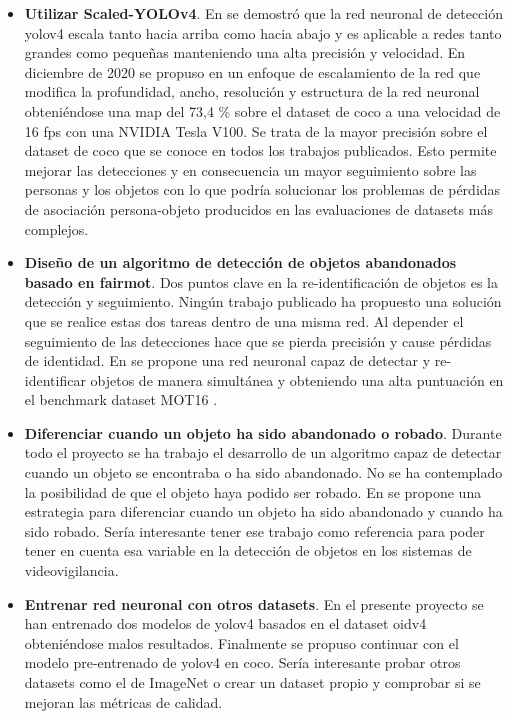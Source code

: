 \begin{itemize}
    \item \textbf{Utilizar Scaled-YOLOv4}. En \cite{bochkovskiy2020yolov4} se demostró que la red neuronal de detección \gls{yolov4} escala tanto hacia arriba como hacia abajo y es aplicable a redes tanto grandes como pequeñas manteniendo una alta precisión y velocidad. En diciembre de 2020 se propuso en \cite{wang2021scaledyolov4} un enfoque de escalamiento de la red que modifica la profundidad, ancho, resolución y estructura de la red neuronal obteniéndose una \gls{map} del 73,4 \% sobre el dataset de \gls{coco} a una velocidad de 16 \gls{fps} con una NVIDIA Tesla V100. Se trata de la mayor precisión sobre el dataset de \gls{coco} que se conoce en todos los trabajos publicados. Esto permite mejorar las detecciones y en consecuencia un mayor seguimiento sobre las personas y los objetos con lo que podría solucionar los problemas de pérdidas de asociación persona-objeto producidos en las evaluaciones de datasets más complejos.
    \item \textbf{Diseño de un algoritmo de detección de objetos abandonados basado en \gls{fairmot}}. Dos puntos clave en la re-identificación de objetos es la detección y seguimiento. Ningún trabajo publicado ha propuesto una solución que se realice estas dos tareas dentro de una misma red. Al depender el seguimiento de las detecciones hace que se pierda precisión y cause pérdidas de identidad. En \cite{zhang2020fair} se propone una red neuronal capaz de detectar y re-identificar objetos de manera simultánea y obteniendo una alta puntuación en el benchmark dataset MOT16 \cite{milan2016mot16}.
    \item \textbf{Diferenciar cuando un objeto ha sido abandonado o robado}. Durante todo el proyecto se ha trabajo el desarrollo de un algoritmo capaz de detectar cuando un objeto se encontraba o ha sido abandonado. No se ha contemplado la posibilidad de que el objeto haya podido ser robado. En \cite{9079525} se propone una estrategia para diferenciar cuando un objeto ha sido abandonado y cuando ha sido robado. Sería interesante tener ese trabajo como referencia para poder tener en cuenta esa variable en la detección de objetos en los sistemas de videovigilancia.
    \item \textbf{Entrenar red neuronal con otros datasets}. En el presente proyecto se han entrenado dos modelos de \gls{yolov4} basados en el dataset \gls{oidv4} obteniéndose malos resultados. Finalmente se propuso continuar con el modelo pre-entrenado de \gls{yolov4} en \gls{coco}. Sería interesante probar otros datasets como el de ImageNet \cite{russakovsky2015imagenet} o crear un dataset propio y comprobar si se mejoran las métricas de calidad.

\end{itemize}
